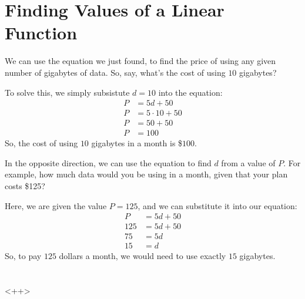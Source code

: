 \documentclass[12pt]{article}
\begin{document}
\section{Finding Values of a Linear Function}
We can use the equation we just found, to find the price of using any given number of gigabytes of data. So, say, what's the cost of using $10$ gigabytes?
\par To solve this, we simply subsistute $d = 10$ into the equation:
\begin{align*}
P &= 5d + 50\\
P &= 5 \cdot 10 + 50\\
P &= 50 + 50\\
P&= 100
\end{align*}
So, the cost of using $10$ gigabytes in a month is \$$100$.
\par In the opposite direction, we can use the equation to find $d$ from a value of $P$. For example, how much data would you be using in a month, given that your plan costs \$125?
\par Here, we are given the value $P = 125$, and we can substitute it into our equation:
\begin{align*}
P &= 5d + 50\\
125 &= 5d + 50\\
75 &= 5d\\
15 &= d
\end{align*}
So, to pay $125$ dollars a month, we would need to use exactly $15$ gigabytes.
\section{}<++>
\end{document}
